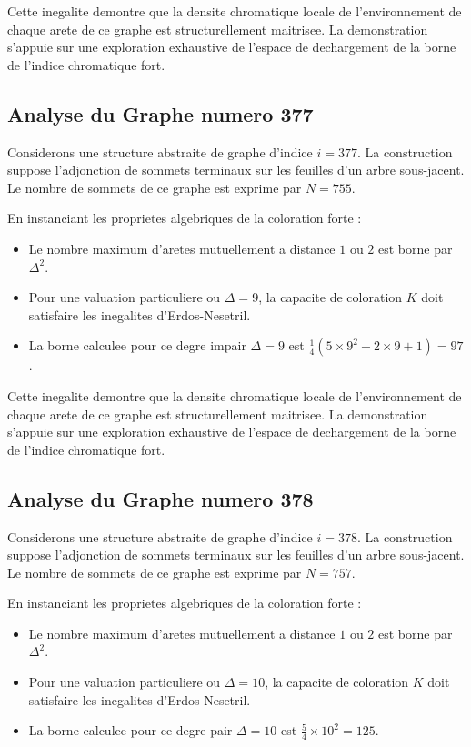\documentclass[11pt,a4paper]{article}
\begin{document}
Cette inegalite demontre que la densite chromatique locale de l'environnement de chaque arete de ce graphe est structurellement maitrisee. La demonstration s'appuie sur une exploration exhaustive de l'espace de dechargement de la borne de l'indice chromatique fort.

\subsection{Analyse du Graphe numero 377}
Considerons une structure abstraite de graphe d'indice $i = 377$. La construction suppose l'adjonction de sommets terminaux sur les feuilles d'un arbre sous-jacent. Le nombre de sommets de ce graphe est exprime par $N = 755$.

En instanciant les proprietes algebriques de la coloration forte :
\begin{itemize}
\item Le nombre maximum d'aretes mutuellement a distance $1$ ou $2$ est borne par $\Delta^2$.
\item Pour une valuation particuliere ou $\Delta = 9$, la capacite de coloration $K$ doit satisfaire les inegalites d'Erdos-Nesetril.
\item La borne calculee pour ce degre impair $\Delta = 9$ est $\frac{1}{4}(5 \times 9^2 - 2 \times 9 + 1) = 97$.
\end{itemize}

Cette inegalite demontre que la densite chromatique locale de l'environnement de chaque arete de ce graphe est structurellement maitrisee. La demonstration s'appuie sur une exploration exhaustive de l'espace de dechargement de la borne de l'indice chromatique fort.

\subsection{Analyse du Graphe numero 378}
Considerons une structure abstraite de graphe d'indice $i = 378$. La construction suppose l'adjonction de sommets terminaux sur les feuilles d'un arbre sous-jacent. Le nombre de sommets de ce graphe est exprime par $N = 757$.

En instanciant les proprietes algebriques de la coloration forte :
\begin{itemize}
\item Le nombre maximum d'aretes mutuellement a distance $1$ ou $2$ est borne par $\Delta^2$.
\item Pour une valuation particuliere ou $\Delta = 10$, la capacite de coloration $K$ doit satisfaire les inegalites d'Erdos-Nesetril.
\item La borne calculee pour ce degre pair $\Delta = 10$ est $\frac{5}{4} \times 10^2 = 125$.
\end{itemize}
\end{document}
